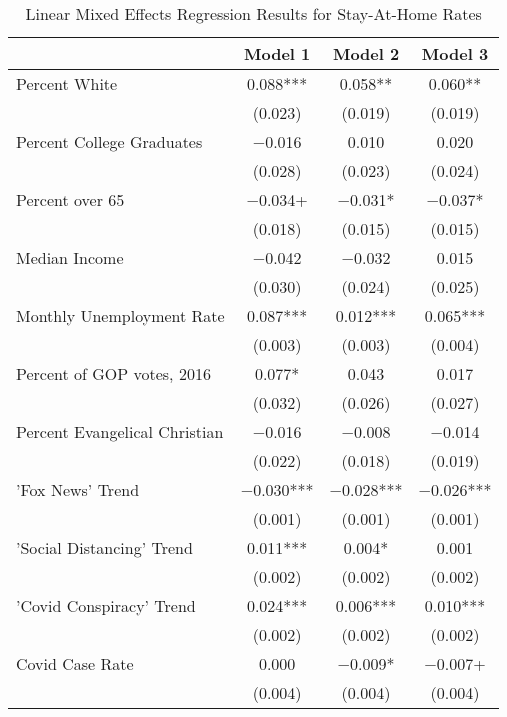 \begin{table}[!h]

\caption{\label{tab:google-tab}Linear Mixed Effects Regression Results for Stay-At-Home Rates}
\centering
\fontsize{8}{10}\selectfont
\begin{tabular}[t]{lccc}
\toprule
  & Model 1 & Model 2 & Model 3\\
\midrule
Percent White & \num{0.088}*** & \num{0.058}** & \num{0.060}**\\
 & (\num{0.023}) & (\num{0.019}) & (\num{0.019})\\
Percent College Graduates & \num{-0.016} & \num{0.010} & \num{0.020}\\
 & (\num{0.028}) & (\num{0.023}) & (\num{0.024})\\
Percent over 65 & \num{-0.034}+ & \num{-0.031}* & \num{-0.037}*\\
 & (\num{0.018}) & (\num{0.015}) & (\num{0.015})\\
Median Income & \num{-0.042} & \num{-0.032} & \num{0.015}\\
 & (\num{0.030}) & (\num{0.024}) & (\num{0.025})\\
Monthly Unemployment Rate & \num{0.087}*** & \num{0.012}*** & \num{0.065}***\\
 & (\num{0.003}) & (\num{0.003}) & (\num{0.004})\\
Percent of GOP votes, 2016 & \num{0.077}* & \num{0.043} & \num{0.017}\\
 & (\num{0.032}) & (\num{0.026}) & (\num{0.027})\\
Percent Evangelical Christian & \num{-0.016} & \num{-0.008} & \num{-0.014}\\
 & (\num{0.022}) & (\num{0.018}) & (\num{0.019})\\
'Fox News' Trend & \num{-0.030}*** & \num{-0.028}*** & \num{-0.026}***\\
 & (\num{0.001}) & (\num{0.001}) & \vphantom{1} (\num{0.001})\\
'Social Distancing' Trend & \num{0.011}*** & \num{0.004}* & \num{0.001}\\
 & (\num{0.002}) & (\num{0.002}) & \vphantom{1} (\num{0.002})\\
'Covid Conspiracy' Trend & \num{0.024}*** & \num{0.006}*** & \num{0.010}***\\
 & (\num{0.002}) & (\num{0.002}) & (\num{0.002})\\
Covid Case Rate & \num{0.000} & \num{-0.009}* & \num{-0.007}+\\
 & (\num{0.004}) & (\num{0.004}) & (\num{0.004})\\

\end{tabular}
\end{table}
